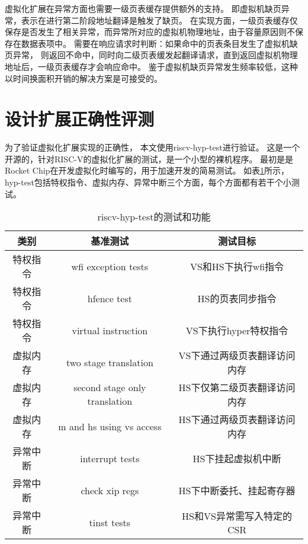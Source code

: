 虚拟化扩展在异常方面也需要一级页表缓存提供额外的支持。
即虚拟机缺页异常，表示在进行第二阶段地址翻译是触发了缺页。
在实现方面，一级页表缓存仅保存是否发生了相关异常，而异常所对应的虚拟机物理地址，由于容量原因则不保存在数据表项中。
需要在响应请求时判断：如果命中的页表条目发生了虚拟机缺页异常，
则返回不命中，同时向二级页表缓发起翻译请求，直到返回虚拟机物理地址后，一级页表缓存才会响应命中。
鉴于虚拟机缺页异常发生频率较低，这种以时间换面积开销的解决方案是可接受的。

\section{设计扩展正确性评测}
为了验证虚拟化扩展实现的正确性，
本文使用riscv-hyp-test\cite{itco2022rocket}进行验证。
这是一个开源的，针对RISC-V的虚拟化扩展的测试，是一个小型的裸机程序。
最初是是Rocket Chip在开发虚拟化时编写的，用于加速开发的简易测试。
如表\ref{tab:hyp-test}所示，
hyp-test包括特权指令、虚拟内存、异常中断三个方面，每个方面都有若干个小测试。

\begin{table}
    \centering
    \caption{riscv-hyp-test的测试和功能}
    \begin{tabular}{ccc}
        \toprule
        类别   & 基准测试                          & 测试目标             \\
        \midrule
        特权指令 & wfi exception tests           & VS和HS下执行wfi指令    \\
        特权指令 & hfence test                   & HS的页表同步指令        \\
        特权指令 & virtual instruction           & VS下执行hyper特权指令   \\
        虚拟内存 & two stage translation         & VS下通过两级页表翻译访问内存  \\
        虚拟内存 & second stage only translation & HS下仅第二级页表翻译访问内存  \\
        虚拟内存 & m and hs using vs access      & HS下通过两级页表翻译访问内存  \\
        异常中断 & interrupt tests               & HS下挂起虚拟机中断       \\
        异常中断 & check xip regs                & HS下中断委托、挂起寄存器    \\
        异常中断 & tinst tests                   & HS和VS异常需写入特定的CSR \\
        \bottomrule
    \end{tabular}
    \label{tab:hyp-test}
\end{table}


